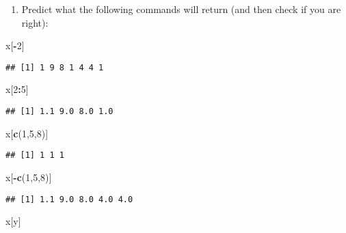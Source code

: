 \documentclass[]{article}
\newenvironment{Shaded}{\begin{snugshade}}{\end{snugshade}}
\newcommand{\KeywordTok}[1]{\textcolor[rgb]{0.13,0.29,0.53}{\textbf{#1}}}
\newcommand{\DecValTok}[1]{\textcolor[rgb]{0.00,0.00,0.81}{#1}}
\newcommand{\OperatorTok}[1]{\textcolor[rgb]{0.81,0.36,0.00}{\textbf{#1}}}
\newcommand{\NormalTok}[1]{#1}
\providecommand{\tightlist}{%
  \setlength{\itemsep}{0pt}\setlength{\parskip}{0pt}}
\begin{document}
\begin{enumerate}
\def\labelenumi{\arabic{enumi}.}
\tightlist
\item
  Predict what the following commands will return (and then check if you
  are right):
\end{enumerate}

\begin{Shaded}
\begin{Highlighting}[]
\NormalTok{x[}\OperatorTok{-}\DecValTok{2}\NormalTok{]}
\end{Highlighting}
\end{Shaded}

\begin{verbatim}
## [1] 1 9 8 1 4 4 1
\end{verbatim}

\begin{Shaded}
\begin{Highlighting}[]
\NormalTok{x[}\DecValTok{2}\OperatorTok{:}\DecValTok{5}\NormalTok{]}
\end{Highlighting}
\end{Shaded}

\begin{verbatim}
## [1] 1.1 9.0 8.0 1.0
\end{verbatim}

\begin{Shaded}
\begin{Highlighting}[]
\NormalTok{x[}\KeywordTok{c}\NormalTok{(}\DecValTok{1}\NormalTok{,}\DecValTok{5}\NormalTok{,}\DecValTok{8}\NormalTok{)]}
\end{Highlighting}
\end{Shaded}

\begin{verbatim}
## [1] 1 1 1
\end{verbatim}

\begin{Shaded}
\begin{Highlighting}[]
\NormalTok{x[}\OperatorTok{-}\KeywordTok{c}\NormalTok{(}\DecValTok{1}\NormalTok{,}\DecValTok{5}\NormalTok{,}\DecValTok{8}\NormalTok{)]}
\end{Highlighting}
\end{Shaded}

\begin{verbatim}
## [1] 1.1 9.0 8.0 4.0 4.0
\end{verbatim}

\begin{Shaded}
\begin{Highlighting}[]
\NormalTok{x[y]}
\end{Highlighting}
\end{Shaded}
\end{document}
